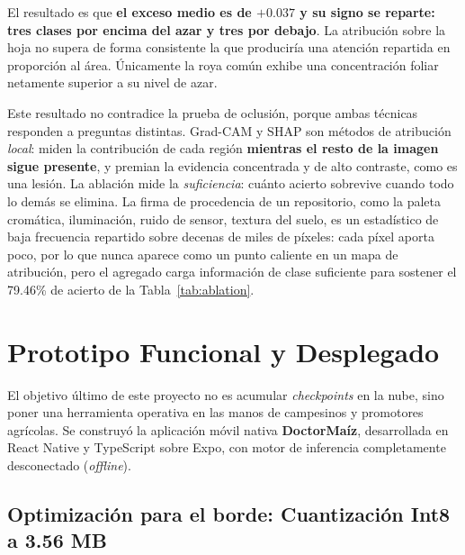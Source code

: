 \documentclass[12pt,letterpaper]{article}
\begin{document}
El resultado es que \textbf{el exceso medio es de $+0.037$ y su signo se reparte: tres clases por encima del azar y tres por debajo}. La atribuci\'on sobre la hoja no supera de forma consistente la que producir\'ia una atenci\'on repartida en proporci\'on al \'area. \'Unicamente la roya com\'un exhibe una concentraci\'on foliar netamente superior a su nivel de azar.

Este resultado no contradice la prueba de oclusi\'on, porque ambas t\'ecnicas responden a preguntas distintas. Grad-CAM y SHAP son m\'etodos de atribuci\'on \textit{local}: miden la contribuci\'on de cada regi\'on \textbf{mientras el resto de la imagen sigue presente}, y premian la evidencia concentrada y de alto contraste, como es una lesi\'on. La ablaci\'on mide la \textit{suficiencia}: cu\'anto acierto sobrevive cuando todo lo dem\'as se elimina. La firma de procedencia de un repositorio, como la paleta crom\'atica, iluminaci\'on, ruido de sensor, textura del suelo, es un estad\'istico de baja frecuencia repartido sobre decenas de miles de p\'ixeles: cada p\'ixel aporta poco, por lo que nunca aparece como un punto caliente en un mapa de atribuci\'on, pero el agregado carga informaci\'on de clase suficiente para sostener el 79.46\% de acierto de la Tabla~\ref{tab:ablation}.

\newpage

\section{Prototipo Funcional y Desplegado}

El objetivo \'ultimo de este proyecto no es acumular \textit{checkpoints} en la nube, sino poner una herramienta operativa en las manos de campesinos y promotores agr\'icolas. Se construy\'o la aplicaci\'on m\'ovil nativa \textbf{DoctorMa\'iz}, desarrollada en React Native y TypeScript sobre Expo, con motor de inferencia completamente desconectado (\textit{offline}).

\subsection{Optimizaci\'on para el borde: Cuantizaci\'on Int8 a 3.56 MB}
\end{document}
